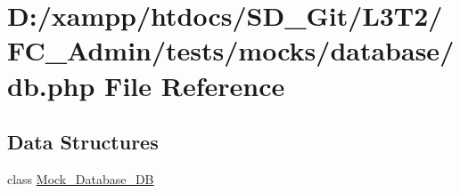 \hypertarget{_admin_2tests_2mocks_2database_2_d_b_8php}{}\section{D\+:/xampp/htdocs/\+S\+D\+\_\+\+Git/\+L3\+T2/\+F\+C\+\_\+\+Admin/tests/mocks/database/db.php File Reference}
\label{_admin_2tests_2mocks_2database_2_d_b_8php}
\subsection*{Data Structures}
\begin{DoxyCompactItemize}
\item 
class \hyperlink{class_mock___database___d_b}{Mock\+\_\+\+Database\+\_\+\+D\+B}
\end{DoxyCompactItemize}
